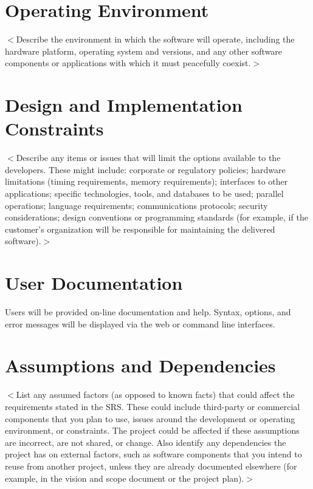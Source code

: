 \documentclass{scrreprt}
\begin{document}
\section{Operating Environment}
$<$Describe the environment in which the software will operate, including the 
hardware platform, operating system and versions, and any other software 
components or applications with which it must peacefully coexist.$>$

\section{Design and Implementation Constraints}
$<$Describe any items or issues that will limit the options available to the 
developers. These might include: corporate or regulatory policies; hardware 
limitations (timing requirements, memory requirements); interfaces to other 
applications; specific technologies, tools, and databases to be used; parallel 
operations; language requirements; communications protocols; security 
considerations; design conventions or programming standards (for example, if the 
customer’s organization will be responsible for maintaining the delivered 
software).$>$

\section{User Documentation}

Users will be provided on-line documentation and help.  Syntax, options, and error
messages will be displayed via the web or command line interfaces.

\section{Assumptions and Dependencies}

$<$List any assumed factors (as opposed to known facts) that could affect the 
requirements stated in the SRS. These could include third-party or commercial 
components that you plan to use, issues around the development or operating 
environment, or constraints. The project could be affected if these assumptions 
are incorrect, are not shared, or change. Also identify any dependencies the 
project has on external factors, such as software components that you intend to 
reuse from another project, unless they are already documented elsewhere (for 
example, in the vision and scope document or the project plan).$>$
\end{document}
